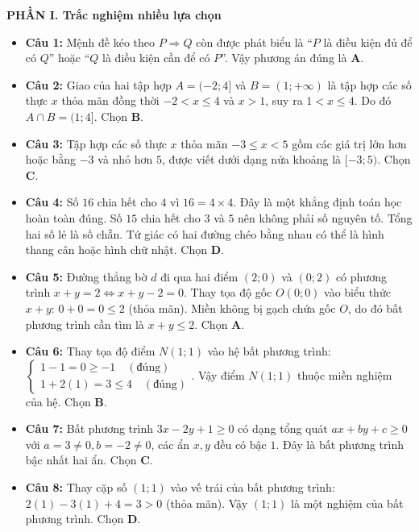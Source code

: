 \documentclass[12pt,a4paper]{article}
\begin{document}
\textbf{\large PHẦN I. Trắc nghiệm nhiều lựa chọn}
\begin{itemize}[leftmargin=0.6cm, itemsep=2.5pt, topsep=1pt]
\item \textbf{Câu 1:} Mệnh đề kéo theo $P \Rightarrow Q$ còn được phát biểu là ``$P$ là điều kiện đủ để có $Q$'' hoặc ``$Q$ là điều kiện cần để có $P$''. Vậy phương án đúng là \textbf{A}.

\item \textbf{Câu 2:} Giao của hai tập hợp $A = (-2; 4]$ và $B = (1; +\infty)$ là tập hợp các số thực $x$ thỏa mãn đồng thời $-2 < x \le 4$ và $x > 1$, suy ra $1 < x \le 4$. Do đó $A \cap B = (1; 4]$. Chọn \textbf{B}.

\item \textbf{Câu 3:} Tập hợp các số thực $x$ thỏa mãn $-3 \le x < 5$ gồm các giá trị lớn hơn hoặc bằng $-3$ và nhỏ hơn $5$, được viết dưới dạng nửa khoảng là $[-3; 5)$. Chọn \textbf{C}.

\item \textbf{Câu 4:} Số $16$ chia hết cho $4$ vì $16 = 4 \times 4$. Đây là một khẳng định toán học hoàn toàn đúng. Số $15$ chia hết cho $3$ và $5$ nên không phải số nguyên tố. Tổng hai số lẻ là số chẵn. Tứ giác có hai đường chéo bằng nhau có thể là hình thang cân hoặc hình chữ nhật. Chọn \textbf{D}.

\item \textbf{Câu 5:} Đường thẳng bờ $d$ đi qua hai điểm $(2; 0)$ và $(0; 2)$ có phương trình $x + y = 2 \iff x + y - 2 = 0$. Thay tọa độ gốc $O(0; 0)$ vào biểu thức $x + y$: $0 + 0 = 0 \le 2$ (thỏa mãn). Miền không bị gạch chứa gốc $O$, do đó bất phương trình cần tìm là $x + y \le 2$. Chọn \textbf{A}.

\item \textbf{Câu 6:} Thay tọa độ điểm $N(1; 1)$ vào hệ bất phương trình:
$\begin{cases} 1 - 1 = 0 \ge -1 \quad (\text{đúng}) \\ 1 + 2(1) = 3 \le 4 \quad (\text{đúng}) \end{cases}$.
Vậy điểm $N(1; 1)$ thuộc miền nghiệm của hệ. Chọn \textbf{B}.

\item \textbf{Câu 7:} Bất phương trình $3x - 2y + 1 \ge 0$ có dạng tổng quát $ax + by + c \ge 0$ với $a = 3 \ne 0, b = -2 \ne 0$, các ẩn $x, y$ đều có bậc $1$. Đây là bất phương trình bậc nhất hai ẩn. Chọn \textbf{C}.

\item \textbf{Câu 8:} Thay cặp số $(1; 1)$ vào vế trái của bất phương trình: $2(1) - 3(1) + 4 = 3 > 0$ (thỏa mãn). Vậy $(1; 1)$ là một nghiệm của bất phương trình. Chọn \textbf{D}.


\end{itemize}
\end{document}
